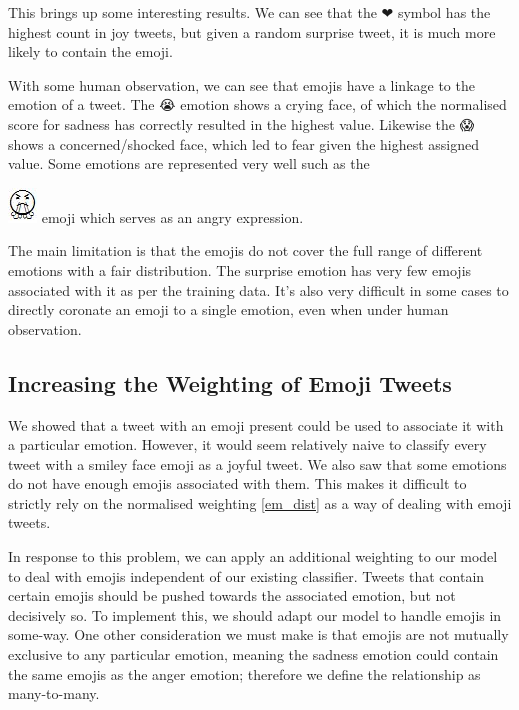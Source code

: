 This brings up some interesting results. We can see that the {\DejaSans ❤} symbol has the highest count in joy tweets, but given a random surprise tweet, it is much more likely to contain the emoji.

With some human observation, we can see that emojis have a linkage to the emotion of a tweet. The {\DejaSans 😭} emotion shows a crying face, of which the normalised score for sadness has correctly resulted in the highest value. Likewise the {\DejaSans 😱} shows a concerned/shocked face, which led to fear given the highest assigned value. Some emotions are represented very well such as the {\includegraphics[scale=0.5]{images/anger.JPG} emoji which serves as an angry expression.

The main limitation is that the emojis do not cover the full range of different emotions with a fair distribution. The surprise emotion has very few emojis associated with it as per the training data. It's also very difficult in some cases to directly coronate an emoji to a single emotion, even when under human observation.

\subsection{Increasing the Weighting of Emoji Tweets} \label{emoj_weighting}

We showed that a tweet with an emoji present could be used to associate it with a particular emotion. However, it would seem relatively naive to classify every tweet with a smiley face emoji as a joyful tweet. We also saw that some emotions do not have enough emojis associated with them. This makes it difficult to strictly rely on the normalised weighting \ref{em_dist} as a way of dealing with emoji tweets.

In response to this problem, we can apply an additional weighting to our model to deal with emojis independent of our existing classifier. Tweets that contain certain emojis should be pushed towards the associated emotion, but not decisively so. To implement this, we should adapt our model to handle emojis in some-way. One other consideration we must make is that emojis are not mutually exclusive to any particular emotion, meaning the sadness emotion could contain the same emojis as the anger emotion; therefore we define the relationship as many-to-many.

}
